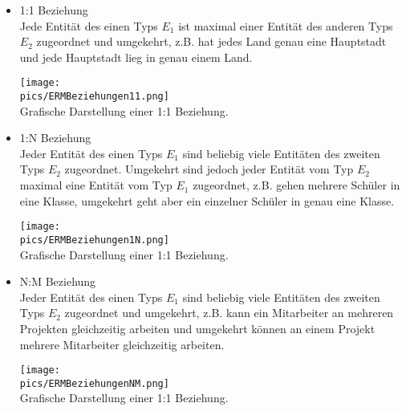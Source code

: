 \begin{itemize}
	\item 1:1 Beziehung\\
	Jede Entität des einen Typs \(E_1\) ist maximal einer Entität des anderen Typs \(E_2\) zugeordnet und umgekehrt, z.B. hat jedes Land genau eine Hauptstadt und jede Hauptstadt lieg in genau einem Land.
	\begin{minipage}{0.8\textwidth}
		\centering\texttt{[image: \\pics/ERMBeziehungen11.png]}\\
		Grafische Darstellung einer 1:1 Beziehung.
	\end{minipage}
	\item 1:N Beziehung\\
	Jeder Entität des einen Typs \(E_1\) sind beliebig viele Entitäten des zweiten Typs \(E_2\) zugeordnet. Umgekehrt sind jedoch jeder Entität vom Typ \(E_2\) maximal eine Entität vom Typ \(E_1\) zugeordnet, z.B. gehen mehrere Schüler in eine Klasse, umgekehrt geht aber ein einzelner Schüler in genau eine Klasse.
	\begin{minipage}{0.8\textwidth}
		\centering\texttt{[image: \\pics/ERMBeziehungen1N.png]}\\
		Grafische Darstellung einer 1:1 Beziehung.
	\end{minipage}
	\item N:M Beziehung\\
	Jeder Entität des einen Typs \(E_1\) sind beliebig viele Entitäten des zweiten Typs \(E_2\) zugeordnet und umgekehrt, z.B. kann ein Mitarbeiter an mehreren Projekten gleichzeitig arbeiten und umgekehrt können an einem Projekt mehrere Mitarbeiter gleichzeitig arbeiten.
	\begin{minipage}{0.8\textwidth}
		\centering\texttt{[image: \\pics/ERMBeziehungenNM.png]}\\
		Grafische Darstellung einer 1:1 Beziehung.
	\end{minipage}
\end{itemize}


